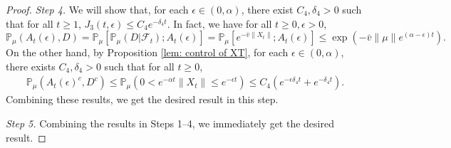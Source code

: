 \documentclass[12pt,a4paper]{amsart}
\theoremstyle{plain}
\theoremstyle{definition}
\numberwithin{equation}{section}
\begin{document}
\begin{proof}
\emph{Step 4.}
We will show that, for each $\epsilon\in (0,  \alpha)$, there exist $C_4,\delta_4>0$ such that for all $t\geq 1$, $J_3(t,\epsilon)\leq C_4e^{-\delta_4 t}.$
In fact, we have  for all $t\geq 0, \epsilon >0$,
\[
  \mathbb P_{\mu}(A_{t}(\epsilon), D)
  = \mathbb P_{\mu}[\mathbb P_{\mu}(D|\mathscr F_t);A_t(\epsilon)]
  = \mathbb P_\mu[e^{-\bar v\|X_t\|};A_t(\epsilon)]
  \leq \exp({-\bar v \|\mu\|e^{(\alpha - \epsilon)t}}).
\]
On the other hand, by Proposition \ref{lem: control of XT}, for each $\epsilon \in (0, \alpha)$, there exists  $C_{4}, \delta_{4}>0$ such that for all $t\geq 0$,
\begin{align}
  \mathbb P_\mu(A_t(\epsilon)^c,D^c)
  \leq \mathbb P_\mu(0 < e^{-\alpha t}\|X_t\|
  \leq e^{ - \epsilon t}) \leq C_{4} (e^{-\epsilon \delta_{4} t}+e^{-\delta_{4} t}).
\end{align}
 Combining these results, we get the desired result in this step.

 \emph{Step 5.} Combining the results in Steps 1--4, we immediately get the desired result.
\end{proof}
\end{document}
